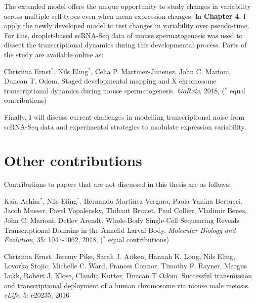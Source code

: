 The extended model offers the unique opportunity to study changes in variability across multiple cell types even when mean expression changes. 
In \textbf{Chapter 4}, I apply the newly developed model to test changes in variability over pseudo-time. 
For this, droplet-based scRNA-Seq data of mouse spermatogenesis was used to dissect the transcriptional dynamics during this developmental process. 
Parts of the study are available online as:

\begin{Abstract}
\hspace{-5mm} Christina Ernst$^\ast$, Nils Eling$^\ast$, Celia P. Martinez-Jimenez, John C. Marioni, Duncan T. Odom. 
Staged developmental mapping and X chromosome transcriptional dynamics during mouse spermatogenesis. \emph{bioRxiv}, 2018, ($^\ast$ equal contributions)
\end{Abstract}

Finally, I will discuss current challenges in modelling transcriptional noise from scRNA-Seq data and experimental strategies to modulate expression variability.

\newpage

\section{Other contributions}

Contributions to papers that are not discussed in this thesis are as follows:\\

\begin{Abstract}
\hspace{-5mm} Kaia Achim$^\ast$, Nils Eling$^\ast$, Hernando Martinez Vergara, Paola Yanina Bertucci, Jacob Musser, Pavel Vopalensky, Thibaut Brunet, Paul Collier, Vladimir Benes, John C. Marioni, Detlev Arendt. 
Whole-Body Single-Cell Sequencing Reveals Transcriptional Domains in the Annelid Larval Body. \emph{Molecular Biology and Evolution}, 35: 1047-1062, 2018, ($^\ast$ equal contributions)
\end{Abstract}

\begin{Abstract}
\hspace{-5mm} Christina Ernst, Jeremy Pike, Sarah J. Aitken, Hannah K. Long, Nils Eling, Lovorka Stojic, Michelle C. Ward, Frances Connor, Timothy F. Rayner, Margus Lukk, Robert J. Klose, Claudia Kutter, Duncan T Odom. 
Successful transmission and transcriptional deployment of a human chromosome via mouse male meiosis. \emph{eLife}, 5: e20235, 2016 
\end{Abstract}